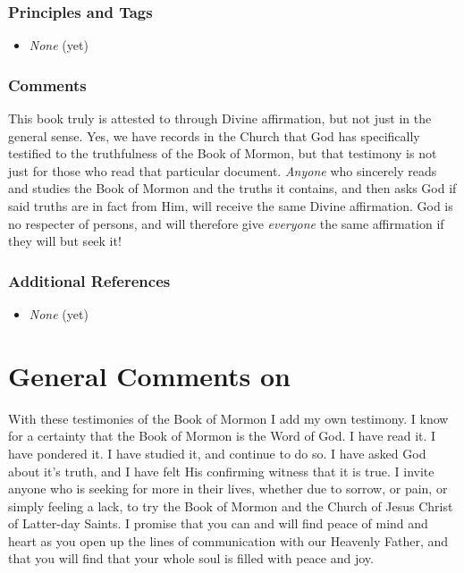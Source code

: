\documentclass[12pt]{report}
\begin{document}
\subsubsection{Principles and Tags\label{js:principlesFinal}}
\begin{itemize}
\item \index{}\emph{None} (yet)
\end{itemize}

\subsubsection{Comments\label{js:commentsFinal}}
This book truly is attested to through Divine affirmation, but not just in the general sense.  Yes, we have records in the Church that God has specifically testified to the truthfulness of the Book of Mormon, but that testimony is not just for those who read that particular document.  \emph{Anyone} who sincerely reads and studies the Book of Mormon and the truths it contains, and then asks God if said truths are in fact from Him, will receive the same Divine affirmation.  God is no respecter of persons, and will therefore give \emph{everyone} the same affirmation if they will but seek it!

\subsubsection{Additional References\label{js:referencesFinal}}
\begin{itemize}
\item \emph{None} (yet)
\end{itemize}

\section{General Comments on }
With these testimonies of the Book of Mormon I add my own testimony.  I know for a certainty that the Book of Mormon is the Word of God.  I have read it.  I have pondered it.  I have studied it, and continue to do so.  I have asked God about it's truth, and I have felt His confirming witness that it is true.  I invite anyone who is seeking for more in their lives, whether due to sorrow, or pain, or simply feeling a lack, to try the Book of Mormon and the Church of Jesus Christ of Latter-day Saints.  I promise that you can and will find peace of mind and heart as you open up the lines of communication with our Heavenly Father, and that you will find that your whole soul is filled with peace and joy.
\end{document}
